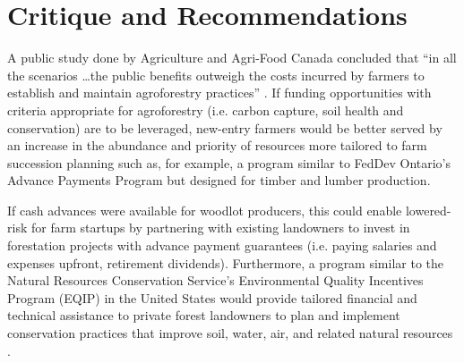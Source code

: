 \documentclass{report}
\begin{document}
\section{Critique and Recommendations}

\hspace{24pt}A public study done by Agriculture and Agri-Food Canada concluded that ``in all the scenarios \dots the public benefits outweigh the costs incurred by farmers to establish and maintain agroforestry practices'' \parencite{socialgood}. If funding opportunities with criteria appropriate for agroforestry (i.e. carbon capture, soil health and conservation) are to be leveraged, new-entry farmers would be better served by an increase in the abundance and priority of resources more tailored to farm succession planning such as, for example, a program similar to FedDev Ontario's Advance Payments Program but designed for timber and lumber production.

\hspace{24pt}If cash advances were available for woodlot producers, this could enable lowered-risk for farm startups by partnering with existing landowners to invest in forestation projects with advance payment guarantees (i.e. paying salaries and expenses upfront, retirement dividends). Furthermore, a program similar to the Natural Resources Conservation Service's Environmental Quality Incentives Program (EQIP) in the United States would provide tailored financial and technical assistance to private forest landowners to plan and implement conservation practices that improve soil, water, air, and related natural resources \parencite{eqip}.


\end{document}
